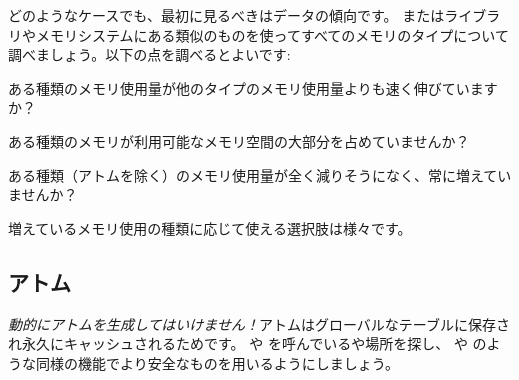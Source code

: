 どのようなケースでも、最初に見るべきはデータの傾向です。 またはライブラリやメモリシステムにある類似のものを使ってすべてのメモリのタイプについて調べましょう。以下の点を調べるとよいです:

\begin{itemize*}
	\item ある種類のメモリ使用量が他のタイプのメモリ使用量よりも速く伸びていますか？
	\item ある種類のメモリが利用可能なメモリ空間の大部分を占めていませんか？
	\item ある種類（アトムを除く）のメモリ使用量が全く減りそうになく、常に増えていませんか？
\end{itemize*}

増えているメモリ使用の種類に応じて使える選択肢は様々です。

\subsection{アトム}

\emph{動的にアトムを生成してはいけません！}アトムはグローバルなテーブルに保存され永久にキャッシュされるためです。 や  を呼んでいるや場所を探し、 や  のような同様の機能でより安全なものを用いるようにしましょう。


